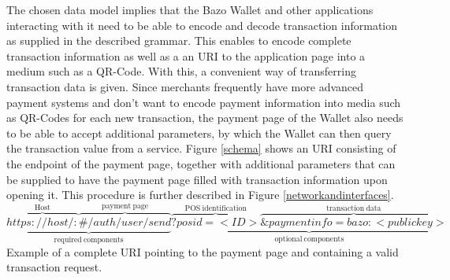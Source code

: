 The chosen data model implies that the Bazo Wallet and other applications
interacting with it need to be able to encode and decode transaction information as supplied in the described grammar.
This enables to encode complete transaction information as well as a an URI to the application page into a medium such as a QR-Code. With this, a convenient way of transferring transaction data is given.
Since merchants frequently have more advanced payment systems and don't want to encode payment information into media such as QR-Codes for each new transaction, the payment page of the Wallet also needs to be able to accept additional parameters, by which the Wallet can then query the transaction value from a service.
Figure \ref{schema} shows an URI consisting of the endpoint of the payment page, together with additional parameters that can be supplied to have the payment page filled with transaction information upon opening it. This procedure is further described in Figure \ref{networkandinterfaces}.
\[
\underbrace{\overbrace{https://host/:}^{\mathrm{Host}}\overbrace{\#/auth/user/send}^{\mathrm{payment\ page}}}_{\mathrm{required\ components}}
\underbrace{\overbrace{?posid=<ID>}^{\mathrm{POS\  identification}}\overbrace{\&paymentinfo=bazo:<public key>}^{\mathrm{transaction\ data}}}_{\mathrm{optional\ components}}
\]\label{fig:schema}Example of a complete URI pointing to the payment page and containing a valid transaction request.


